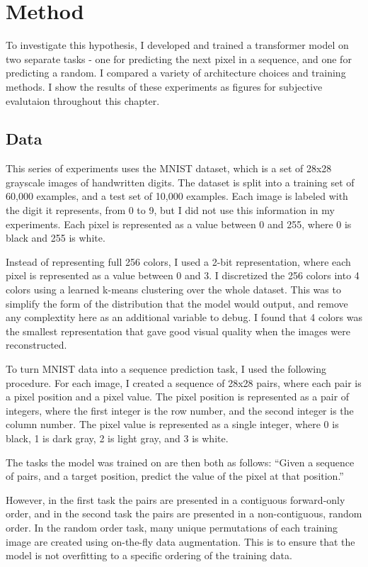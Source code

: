 \section{Method}

To investigate this hypothesis, I developed and trained a transformer model on two separate tasks - one for predicting the next pixel in a sequence, and one for predicting a random. I compared a variety of architecture choices and training methods. I show the results of these experiments as figures for subjective evalutaion throughout this chapter.

\subsection{Data}

This series of experiments uses the MNIST dataset, which is a set of 28x28 grayscale images of handwritten digits. The dataset is split into a training set of 60,000 examples, and a test set of 10,000 examples. Each image is labeled with the digit it represents, from 0 to 9, but I did not use this information in my experiments. Each pixel is represented as a value between 0 and 255, where 0 is black and 255 is white.

Instead of representing full 256 colors, I used a 2-bit representation, where each pixel is represented as a value between 0 and 3. I discretized the 256 colors into 4 colors using a learned k-means clustering over the whole dataset. This was to simplify the form of the distribution that the model would output, and remove any complextity here as an additional variable to debug. I found that 4 colors was the smallest representation that gave good visual quality when the images were reconstructed.

To turn MNIST data into a sequence prediction task, I used the following procedure. For each image, I created a sequence of 28x28 pairs, where each pair is a pixel position and a pixel value. The pixel position is represented as a pair of integers, where the first integer is the row number, and the second integer is the column number. The pixel value is represented as a single integer, where 0 is black, 1 is dark gray, 2 is light gray, and 3 is white.


The tasks the model was trained on are then both as follows: ``Given a sequence of pairs, and a target position, predict the value of the pixel at that position.''

However, in the first task the pairs are presented in a contiguous forward-only order, and in the second task the pairs are presented in a non-contiguous, random order. In the random order task, many unique permutations of each training image are created using on-the-fly data augmentation. This is to ensure that the model is not overfitting to a specific ordering of the training data.

